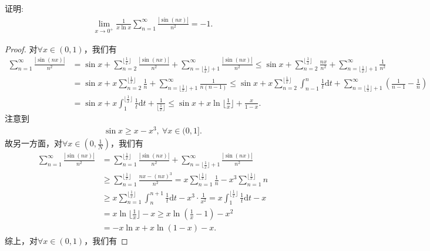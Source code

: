 \documentclass[../../main.tex]{subfiles}%
\begin{document}
\begin{example}
证明:
\begin{align*}
\lim_{x \to 0^+} \frac{1}{x \ln x} \sum_{n=1}^{\infty} \frac{|\sin(nx)|}{n^2} = -1.
\end{align*}
\end{example}
\begin{proof}

对$\forall x\in (0,1)$，我们有
\begin{align*}
\sum_{n=1}^{\infty}\frac{|\sin(nx)|}{n^2} &= \sin x + \sum_{n=2}^{\lfloor \frac{1}{x} \rfloor}\frac{|\sin(nx)|}{n^2} + \sum_{n=\lfloor \frac{1}{x} \rfloor +1}^{\infty}\frac{|\sin(nx)|}{n^2} \leqslant \sin x + \sum_{n=2}^{\lfloor \frac{1}{x} \rfloor}\frac{nx}{n^2} + \sum_{n=\lfloor \frac{1}{x} \rfloor +1}^{\infty}\frac{1}{n^2} \\
&= \sin x + x\sum_{n=2}^{\lfloor \frac{1}{x} \rfloor}\frac{1}{n} + \sum_{n=\lfloor \frac{1}{x} \rfloor +1}^{\infty}\frac{1}{n(n-1)} \leqslant \sin x + x\sum_{n=2}^{\lfloor \frac{1}{x} \rfloor}\int_{n-1}^n\frac{1}{t}\mathrm{d}t + \sum_{n=\lfloor \frac{1}{x} \rfloor +1}^{\infty}\left( \frac{1}{n-1} - \frac{1}{n} \right) \\
&= \sin x + x\int_1^{\lfloor \frac{1}{x} \rfloor}\frac{1}{t}\mathrm{d}t + \frac{1}{\lfloor \frac{1}{x} \rfloor} \leqslant \sin x + x\ln \lfloor \frac{1}{x} \rfloor + \frac{x}{1-x}.
\end{align*}
注意到
\begin{align*}
\sin x\geqslant x-x^3,\ \forall x\in (0,1].
\end{align*}
故另一方面，对$\forall x\in (0,\frac{1}{N})$，我们有
\begin{align*}
\sum_{n=1}^{\infty}\frac{|\sin(nx)|}{n^2}&=\sum_{n=1}^{\lfloor \frac{1}{x} \rfloor}\frac{|\sin(nx)|}{n^2}+\sum_{n=\lfloor \frac{1}{x} \rfloor +1}^{\infty}\frac{|\sin(nx)|}{n^2} \\
&\geqslant \sum_{n=1}^{\lfloor \frac{1}{x} \rfloor}\frac{nx-(nx)^3}{n^2}=x\sum_{n=1}^{\lfloor \frac{1}{x} \rfloor}\frac{1}{n}-x^3\sum_{n=1}^{\lfloor \frac{1}{x} \rfloor}n \\
&\geqslant x\sum_{n=1}^{\lfloor \frac{1}{x} \rfloor}\int_n^{n+1}\frac{1}{t}\mathrm{d}t-x^3\cdot \frac{1}{x^2}=x\int_1^{\lfloor \frac{1}{x} \rfloor}\frac{1}{t}\mathrm{d}t-x \\
&=x\ln \lfloor \frac{1}{x} \rfloor -x\geqslant x\ln \left( \frac{1}{x}-1 \right) -x^2\\
&=-x\ln x+x\ln \left( 1-x \right) -x.
\end{align*}
综上，对$\forall x\in (0,1)$，我们有

\end{proof}
\end{document}
